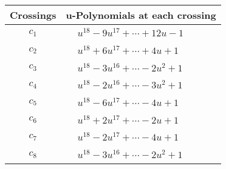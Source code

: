 \documentclass[1p]{elsarticle_modified}
\theoremstyle{definition}
\begin{document}
\begin{tabular}{m{50pt}|m{274pt}}
Crossings & \hspace{64pt}u-Polynomials at each crossing \\
\hline $$\begin{aligned}c_{1}\end{aligned}$$&$\begin{aligned}
&u^{18}-9 u^{17}+\cdots+12 u-1
\end{aligned}$\\
\hline $$\begin{aligned}c_{2}\end{aligned}$$&$\begin{aligned}
&u^{18}+6 u^{17}+\cdots+4 u+1
\end{aligned}$\\
\hline $$\begin{aligned}c_{3}\end{aligned}$$&$\begin{aligned}
&u^{18}-3 u^{16}+\cdots-2 u^2+1
\end{aligned}$\\
\hline $$\begin{aligned}c_{4}\end{aligned}$$&$\begin{aligned}
&u^{18}-2 u^{16}+\cdots-3 u^2+1
\end{aligned}$\\
\hline $$\begin{aligned}c_{5}\end{aligned}$$&$\begin{aligned}
&u^{18}-6 u^{17}+\cdots-4 u+1
\end{aligned}$\\
\hline $$\begin{aligned}c_{6}\end{aligned}$$&$\begin{aligned}
&u^{18}+2 u^{17}+\cdots-2 u+1
\end{aligned}$\\
\hline $$\begin{aligned}c_{7}\end{aligned}$$&$\begin{aligned}
&u^{18}-2 u^{17}+\cdots-4 u+1
\end{aligned}$\\
\hline $$\begin{aligned}c_{8}\end{aligned}$$&$\begin{aligned}
&u^{18}-3 u^{16}+\cdots-2 u^2+1
\end{aligned}$\\

\end{tabular}
\end{document}

